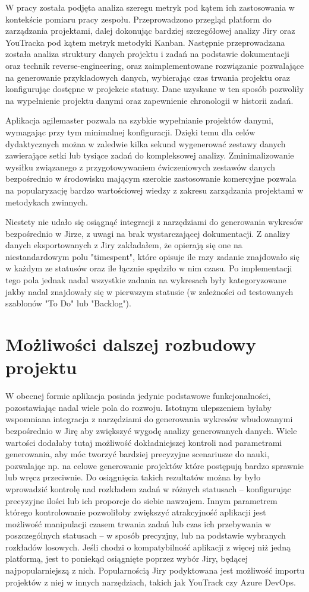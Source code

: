 W pracy została podjęta analiza szeregu metryk pod kątem ich zastosowania w kontekście pomiaru pracy zespołu.
Przeprowadzono przegląd platform do zarządzania projektami, dalej dokonując bardziej szczegółowej analizy Jiry oraz YouTracka pod kątem
metryk metodyki Kanban.
Następnie przeprowadzana została analiza struktury danych projektu i zadań na podstawie dokumentacji oraz technik reverse-engineering, oraz zaimplementowane rozwiązanie
pozwalające na generowanie przykładowych danych, wybierając czas trwania projektu oraz konfigurując dostępne w projekcie statusy.
Dane uzyskane w ten sposób pozwoliły na wypełnienie projektu danymi oraz zapewnienie chronologii w historii zadań.

Aplikacja agilemaster pozwala na szybkie wypełnianie projektów danymi, wymagając przy tym minimalnej konfiguracji. Dzięki temu dla celów dydaktycznych można w zaledwie kilka sekund wygenerować
zestawy danych zawierające setki lub tysiące zadań do kompleksowej analizy. Zminimalizowanie wysiłku związanego z przygotowywaniem ćwiczeniowych zestawów danych bezpośrednio w środowisku
mającym szerokie zastosowanie komercyjne pozwala na popularyzację bardzo wartościowej wiedzy z zakresu zarządzania projektami w metodykach zwinnych.

Niestety nie udało się osiągnąć integracji z narzędziami do generowania wykresów bezpośrednio w Jirze, z uwagi na brak wystarczającej dokumentacji.
Z analizy danych eksportowanych z Jiry zakładałem, że opierają się one na niestandardowym polu "timespent", które opisuje ile razy zadanie znajdowało się w każdym ze statusów
oraz ile łącznie spędziło w nim czasu. Po implementacji tego pola jednak nadal wszystkie zadania na wykresach były kategoryzowane jakby nadal znajdowały się w pierwszym statusie (w zależności
od testowanych szablonów "To Do" lub "Backlog").

\section*{Możliwości dalszej rozbudowy projektu}
W obecnej formie aplikacja posiada jedynie podstawowe funkcjonalności, pozostawiając nadal wiele pola do rozwoju.
Istotnym ulepszeniem byłaby wspomniana integracja z narzędziami do generowania wykresów wbudowanymi bezpośrednio w Jirę aby zwiększyć wygodę analizy generowanych danych.
Wiele wartości dodałaby tutaj możliwość dokładniejszej kontroli nad parametrami generowania, aby móc tworzyć bardziej precyzyjne scenariusze do nauki, pozwalając np. na celowe generowanie projektów
które postępują bardzo sprawnie lub wręcz przeciwnie. Do osiągnięcia takich rezultatów można by było wprowadzić kontrolę nad rozkładem zadań w różnych statusach -- konfigurując precyzyjne ilości lub
ich proporcje do siebie nawzajem. Innym parametrem którego kontrolowanie pozwoliłoby zwiększyć atrakcyjność aplikacji jest możliwość manipulacji czasem trwania zadań lub czas ich przebywania w 
poszczególnych statusach -- w sposób precyzjny, lub na podstawie wybranych rozkładów losowych.
Jeśli chodzi o kompatybilność aplikacji z więcej niż jedną platformą, jest to poniekąd osiągnięte poprzez wybór Jiry, będącej najpopularniejszą z nich.
Popularnością Jiry podyktowana jest możliwość importu projektów z niej w innych narzędziach, takich jak YouTrack czy Azure DevOps.
